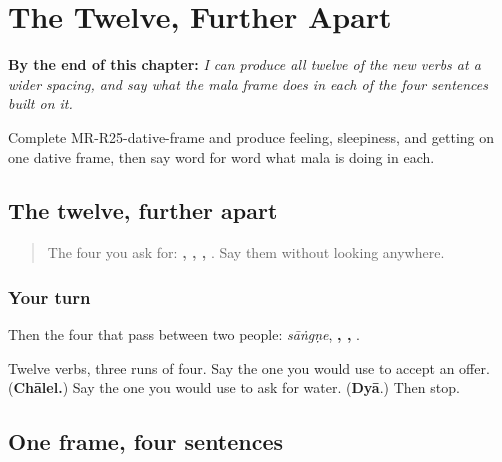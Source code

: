 
\chapter{The Twelve, Further Apart}
\label{ch:mr-twelve-verbs-r2}

\begin{chapteropening}
\textbf{By the end of this chapter:} \emph{I can produce all twelve of the new verbs at a wider spacing, and say what the mala frame does in each of the four sentences built on it.}

Complete MR-R25-dative-frame and produce feeling, sleepiness, and getting on one dative frame, then say word for word what mala is doing in each.
\end{chapteropening}

\section[bārā kriyāpadaṁ]{The twelve, further apart}

\label{lesson:MR-R25-twelve-verbs}



\begin{quote}
The four you ask for: \textbf{, , , }. Say them without looking anywhere.
\end{quote}

\subsection*{Your turn}
Then the four that pass between two people: \emph{sāṅgṇe}, \textbf{, , }.

\begin{tcolorbox}[breakable,colback=teal!4,colframe=teal!35!black,title={Before you move on}]
Twelve verbs, three runs of four. Say the one you would use to accept an offer. (\textbf{Chālel.}) Say the one you would use to ask for water. (\textbf{Dyā}.) Then stop.
\end{tcolorbox}
\section[malā …]{One frame, four sentences}

